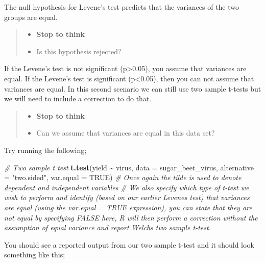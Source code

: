 \documentclass[
]{book}
\newenvironment{Shaded}{\begin{snugshade}}{\end{snugshade}}
\newcommand{\AttributeTok}[1]{\textcolor[rgb]{0.13,0.29,0.53}{#1}}
\newcommand{\CommentTok}[1]{\textcolor[rgb]{0.56,0.35,0.01}{\textit{#1}}}
\newcommand{\ConstantTok}[1]{\textcolor[rgb]{0.56,0.35,0.01}{#1}}
\newcommand{\FunctionTok}[1]{\textcolor[rgb]{0.13,0.29,0.53}{\textbf{#1}}}
\newcommand{\NormalTok}[1]{#1}
\newcommand{\SpecialCharTok}[1]{\textcolor[rgb]{0.81,0.36,0.00}{\textbf{#1}}}
\newcommand{\StringTok}[1]{\textcolor[rgb]{0.31,0.60,0.02}{#1}}
\providecommand{\tightlist}{%
  \setlength{\itemsep}{0pt}\setlength{\parskip}{0pt}}
\begin{document}
The null hypothesis for Levene's test predicts that the variances of the two groups are equal.

\begin{quote}
\begin{itemize}
\tightlist
\item
  \textbf{Stop to think}
\item
  Is this hypothesis rejected?
\end{itemize}
\end{quote}

If the Levene's test is not significant (p\textgreater0.05), you assume that variances are equal. If the Levene's test is significant (p\textless0.05), then you can not assume that variances are equal. In this second scenario we can still use two sample t-tests but we will need to include a correction to do that.

\begin{quote}
\begin{itemize}
\tightlist
\item
  \textbf{Stop to think}
\item
  Can we assume that variances are equal in this data set?
\end{itemize}
\end{quote}

Try running the following;

\begin{Shaded}
\begin{Highlighting}[]
\CommentTok{\# Two sample t test}
\FunctionTok{t.test}\NormalTok{(yield }\SpecialCharTok{\textasciitilde{}}\NormalTok{ virus, }\AttributeTok{data =}\NormalTok{ sugar\_beet\_virus, }\AttributeTok{alternative =} \StringTok{"two.sided"}\NormalTok{, }\AttributeTok{var.equal =} \ConstantTok{TRUE}\NormalTok{)}
\CommentTok{\# Once again the tilde is used to denote dependent and independent variables}
\CommentTok{\# We also specify which type of t{-}test we wish to perform and identify (based on our earlier Levene\textquotesingle{}s test) that variances are equal (using the var.equal = TRUE expression), you can state that they are not equal by specifying FALSE here, R will then perform a correction without the assumption of equal variance and report Welch\textquotesingle{}s two sample t{-}test.}
\end{Highlighting}
\end{Shaded}

You should see a reported output from our two sample t-test and it should look something like this;
\end{document}
